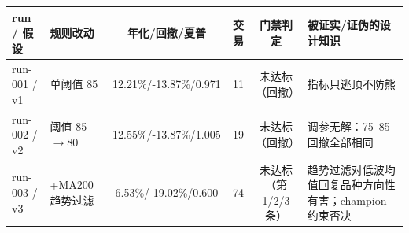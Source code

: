 \begin{tabular}{llcccp{3.6cm}}
\toprule
run / 假设 & 规则改动 & 年化/回撤/夏普 & 交易 & 门禁判定 & 被证实/证伪的设计知识 \\
\midrule
run-001 / v1 & 单阈值 85 & 12.21\%/-13.87\%/0.971 & 11 & 未达标（回撤） & 指标只逃顶不防熊 \\
run-002 / v2 & 阈值 85$\to$80 & 12.55\%/-13.87\%/1.005 & 19 & 未达标（回撤） & 调参无解：75--85 回撤全部相同 \\
run-003 / v3 & +MA200 趋势过滤 & 6.53\%/-19.02\%/0.600 & 74 & 未达标（第1/2/3条） & 趋势过滤对低波均值回复品种方向性有害；champion 约束否决 \\
\bottomrule
\end{tabular}
